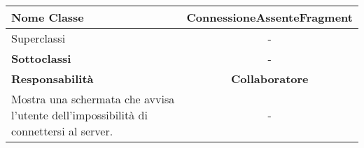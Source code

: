 
\setcounter{table}{0}
\begin{table}[H]
    \centering
    \begin{tabularx}{\textwidth}{||   X  ||  c   ||}
        \hline
        \rowcolor{Gray}
        \textbf{Nome Classe} & ConnessioneAssenteFragment\\
        \hline
        Superclassi  &  - \\
        \hline
        \textbf{Sottoclassi} & - \\
        \hline
        \hline
         \textbf{Responsabilità} & \textbf{Collaboratore} \\
         \hline
           Mostra una schermata che avvisa l'utente dell'impossibilità di connettersi al server.  & - \\
         \hline
    \end{tabularx}
\end{table}
